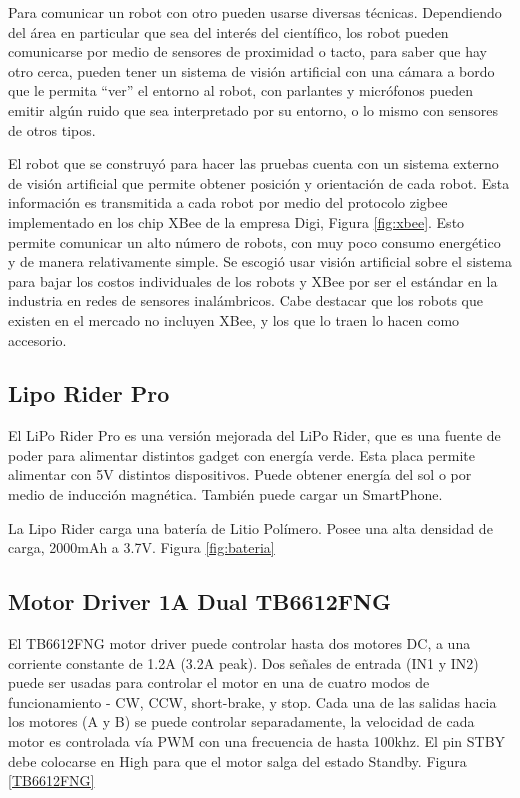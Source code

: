 Para comunicar un robot con otro pueden usarse diversas técnicas. Dependiendo del área en particular que sea del interés del científico, los robot pueden comunicarse por medio de sensores de proximidad o tacto, para saber que hay otro cerca, pueden tener un sistema de visión artificial con una cámara a bordo que le permita “ver” el entorno al robot, con parlantes y micrófonos pueden emitir algún ruido que sea interpretado por su entorno, o lo mismo con sensores de otros tipos.

El robot que se construyó para hacer las pruebas cuenta con un sistema externo de visión artificial que permite obtener posición y orientación de cada robot. Esta información es transmitida a cada robot por medio del protocolo zigbee implementado en los chip XBee de la empresa Digi, Figura \ref{fig:xbee}. Esto permite comunicar un alto número de robots, con muy poco consumo energético y de manera relativamente simple. Se escogió usar visión artificial sobre el sistema para bajar los costos individuales de los robots y XBee por ser el estándar en la industria en redes de sensores inalámbricos. Cabe destacar que los robots que existen en el mercado no incluyen XBee, y los que lo traen lo hacen como accesorio. 

\subsection{Lipo Rider Pro}

El LiPo Rider Pro es una versión mejorada del LiPo Rider, que es una fuente de poder para alimentar distintos gadget con energía verde. Esta placa permite alimentar con 5V distintos dispositivos. Puede obtener energía del sol o por medio de inducción magnética. También puede cargar un SmartPhone.

La Lipo Rider carga una batería de Litio Polímero. Posee una alta densidad de carga, 2000mAh a 3.7V. Figura \ref{fig:bateria}

\subsection{Motor Driver 1A Dual TB6612FNG}
El TB6612FNG motor driver puede controlar hasta dos motores DC, a una corriente constante de 1.2A (3.2A peak). Dos señales de entrada (IN1 y IN2) puede ser usadas para controlar el motor en una de cuatro modos de funcionamiento - CW, CCW, short-brake, y stop. Cada una de las salidas hacia los motores (A y B) se puede controlar separadamente, la velocidad de cada motor es controlada vía PWM con una frecuencia de hasta 100khz. El pin STBY debe colocarse en High para que el motor salga del estado Standby. Figura \ref{TB6612FNG}

